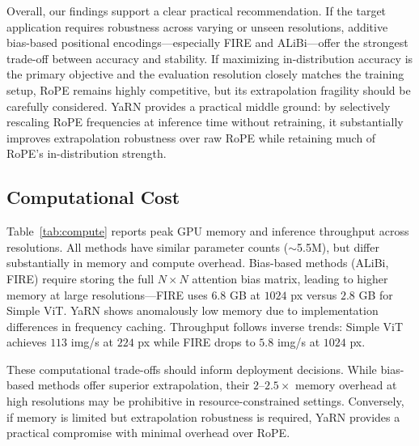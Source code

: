 Overall, our findings support a clear practical recommendation. If the target application requires
robustness across varying or unseen resolutions, additive bias-based positional encodings---especially
FIRE and ALiBi---offer the strongest trade-off between accuracy and stability. If maximizing
in-distribution accuracy is the primary objective and the evaluation resolution closely matches the
training setup, RoPE remains highly competitive, but its extrapolation fragility should be
carefully considered. YaRN provides a practical middle ground: by selectively rescaling RoPE
frequencies at inference time without retraining, it substantially improves extrapolation
robustness over raw RoPE while retaining much of RoPE's in-distribution strength.

\subsection{Computational Cost}

Table~\ref{tab:compute} reports peak GPU memory and inference throughput across resolutions. All methods have similar parameter counts ($\sim$5.5M), but differ substantially in memory and compute overhead. Bias-based methods (ALiBi, FIRE) require storing the full $N \times N$ attention bias matrix, leading to higher memory at large resolutions---FIRE uses $6.8$ GB at $1024$ px versus $2.8$ GB for Simple ViT. YaRN shows anomalously low memory due to implementation differences in frequency caching. Throughput follows inverse trends: Simple ViT achieves $113$ img/s at $224$ px while FIRE drops to $5.8$ img/s at $1024$ px.

These computational trade-offs should inform deployment decisions. While bias-based methods offer superior extrapolation, their $2$--$2.5\times$ memory overhead at high resolutions may be prohibitive in resource-constrained settings. Conversely, if memory is limited but extrapolation robustness is required, YaRN provides a practical compromise with minimal overhead over RoPE.

